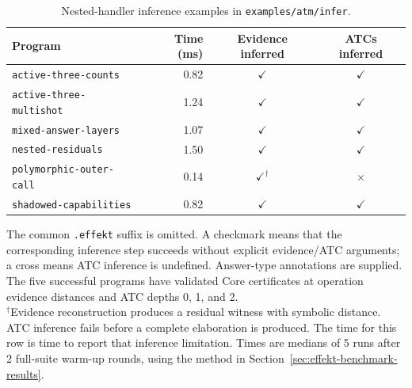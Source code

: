 \begin{table}[htbp]
  \centering
  \caption{Nested-handler inference examples in \texttt{examples/atm/infer}.}
  \label{tab:effekt-inference}
  \small
  \begin{tabular}{@{}lrcc@{}}
    \toprule
    Program & Time (ms) & Evidence inferred & ATCs inferred \\
    \midrule
    \texttt{active-three-counts} & 0.82 & $\checkmark$ & $\checkmark$ \\
    \texttt{active-three-multishot} & 1.24 & $\checkmark$ & $\checkmark$ \\
    \texttt{mixed-answer-layers} & 1.07 & $\checkmark$ & $\checkmark$ \\
    \texttt{nested-residuals} & 1.50 & $\checkmark$ & $\checkmark$ \\
    \texttt{polymorphic-outer-call} & 0.14 & $\checkmark^{\dagger}$ & $\times$ \\
    \texttt{shadowed-capabilities} & 0.82 & $\checkmark$ & $\checkmark$ \\
    \bottomrule
  \end{tabular}
  \par\medskip
  \begin{minipage}{0.94\textwidth}
    \small
    The common \texttt{.effekt} suffix is omitted. A checkmark means that
    the corresponding inference step succeeds without explicit evidence/ATC arguments;
    a cross means ATC inference is undefined. Answer-type annotations are supplied.
    The five successful programs have validated Core certificates at operation
    evidence distances and ATC depths 0, 1, and 2.\\[0.4em]
    $^{\dagger}$Evidence reconstruction produces a residual witness with symbolic
    distance. ATC inference fails before a complete elaboration is produced.
    The time for this row is time to report that inference limitation.
    Times are medians of 5 runs after 2 full-suite warm-up rounds, using the method in Section~\ref{sec:effekt-benchmark-results}.
  \end{minipage}
\end{table}
